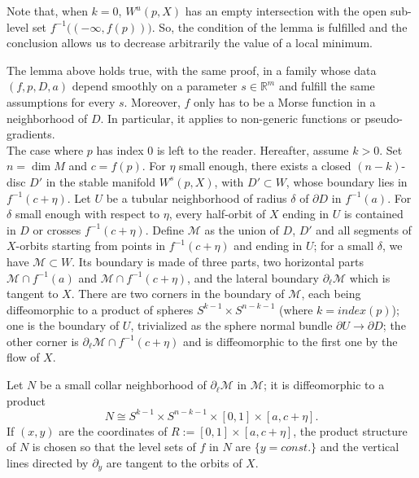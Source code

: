 \documentclass[12pt]{amsart}
\def\R{\mathbb{R}}
\def\de{\delta}
\def\ep{\varepsilon}
\def\nd{\noindent}
\begin{document}
 Note that, when $k=0$, $W^u(p,X)$  has an empty intersection 
 with the open sub-level set  $f^{-1}\bigl((-\infty, f(p))\bigr)$. So, the condition of the lemma is fulfilled
 and the conclusion  allows us to decrease arbitrarily the value of a local minimum.
 
 
The  lemma above holds true, with the same proof, in  a family whose data 
$(f,p,D,a)$ depend smoothly on a parameter $s\in \R^m$
and fulfill  the same assumptions for every $s$. Moreover, 
$f$  only has  to be a Morse function in a neighborhood of $D$. 
In particular, it applies  to non-generic  functions or pseudo-gradients.\\

\nd  {\bf Proof.} The case where $p$ has index 0 is left to the reader. %
Hereafter, assume $k>0$. Set $n=\dim M $ and $c=f(p)$. For $\eta$ small enough, there exists a 
closed $(n-k)$-disc $D'$ in the stable manifold $W^s(p,X)$, with $D'\subset W$,
 whose boundary lies in $f^{-1}(c+\eta)$.
  Let $U$ be a tubular neighborhood of radius $\de$
of $\partial D$ in $f^{-1}(a)$.  For $\de$ small enough with respect
to $\eta$, every half-orbit of $X$ 
ending in $U$ is contained in $D$ or crosses $f^{-1}(c+\eta)$. Define $\mathcal M $ as 
the union of $D$, $D'$
 and all segments of $X$-orbits starting from points in $f^{-1}(c+\eta)$ and ending  in $U$; for a small 
 $\de $, we have $\mathcal M\subset W$. 
Its boundary 
is made of three parts, two horizontal parts 
$\mathcal M\cap f^{-1}(a)$
and $\mathcal M\cap f^{-1}(c+\eta)$, and the lateral boundary 
$\partial_\ell\mathcal M$ which is tangent to $X$.  There are two corners 
in the boundary of $\mathcal M$, each  being diffeomorphic to a product of spheres 
$S^{k-1}\times S^{n-k-1}$ (where $k=index(p)$); one is the boundary of $U$, trivialized as the sphere normal bundle 
$\partial U\to \partial D$; the other corner is $\partial_\ell\mathcal M \cap f^{-1}(c+\eta)$
and is diffeomorphic to the first one by the flow of $X$.

Let $N$ be a small
collar neighborhood of $\partial_\ell\mathcal M$ in $\mathcal M$; it is diffeomorphic to a product
$$N\cong S^{k-1}\times S^{n-k-1}\times[0,1]\times[a,c+\eta].
$$
If $(x,y)$ are the coordinates of $R:=[0,1]\times[a,c+\eta]$, %
the product structure of $N$ is chosen so that the level sets of $f$ in $N$ are $\{y=const.\}$
and the vertical lines directed by $\partial_y$
 are  tangent 
to the orbits of $X$.
\end{document}

